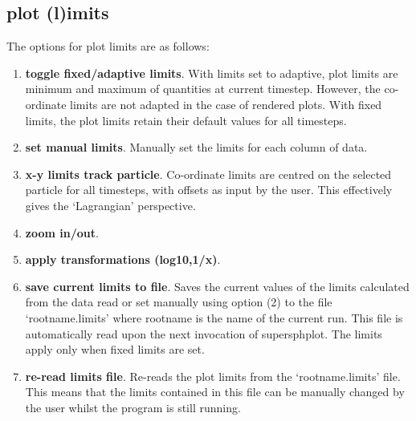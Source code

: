 \documentclass[a4paper,12pt]{article}
\begin{document}
\subsection{plot (l)imits}
 The options for plot limits are as follows:
\begin{enumerate}
\item \textbf{toggle fixed/adaptive limits}. With limits set to adaptive, plot
limits are minimum and maximum of quantities at current
timestep. However, the co-ordinate limits are not adapted in the case of
rendered plots. With fixed limits, the plot limits retain their default values
for all timesteps.
\item \textbf{set manual limits}. Manually set the limits for each column of
data.
\item \textbf{x-y limits track particle}. Co-ordinate limits are centred on the
selected particle for all timesteps, with offsets as input by the user. This
effectively gives the `Lagrangian' perspective.
\item \textbf{zoom in/out}.
\item \textbf{apply transformations (log10,1/x)}.
\item \textbf{save current limits to file}. Saves the current values of the
limits calculated from the data read or set manually using option (2) to the
file `rootname.limits' where rootname is the name of the current run. This file
is automatically read upon the next invocation of supersphplot. The limits apply
only when fixed limits are set.
\item \textbf{re-read limits file}. Re-reads the plot limits from the
`rootname.limits' file. This means that the limits contained in this file can be
manually changed by the user whilst the program is still running.
\end{enumerate}
\end{document}

